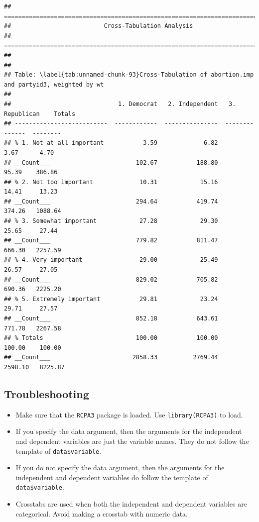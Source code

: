 \documentclass[
]{book}
\providecommand{\tightlist}{%
  \setlength{\itemsep}{0pt}\setlength{\parskip}{0pt}}
\begin{document}
\begin{verbatim}
## ===========================================================================
##                          Cross-Tabulation Analysis
## ===========================================================================
## 
## 
## Table: \label{tab:unnamed-chunk-93}Cross-Tabulation of abortion.imp and partyid3, weighted by wt
## 
##                              1. Democrat   2. Independent   3. Republican    Totals
## --------------------------  ------------  ---------------  --------------  --------
## % 1. Not at all important           3.59             6.82            3.67      4.70
## __Count___                        102.67           188.80           95.39    386.86
## % 2. Not too important             10.31            15.16           14.41     13.23
## __Count___                        294.64           419.74          374.26   1088.64
## % 3. Somewhat important            27.28            29.30           25.65     27.44
## __Count___                        779.82           811.47          666.30   2257.59
## % 4. Very important                29.00            25.49           26.57     27.05
## __Count___                        829.02           705.82          690.36   2225.20
## % 5. Extremely important           29.81            23.24           29.71     27.57
## __Count___                        852.18           643.61          771.78   2267.58
## % Totals                          100.00           100.00          100.00    100.00
## __Count___                       2858.33          2769.44         2598.10   8225.87
\end{verbatim}

\hypertarget{troubleshooting-36}{%
\subsection{Troubleshooting}\label{troubleshooting-36}}

\begin{itemize}
\tightlist
\item
  Make sure that the \texttt{RCPA3} package is loaded. Use \texttt{library(RCPA3)} to load.
\item
  If you specify the data argument, then the arguments for the independent and dependent variables are just the variable names. They do not follow the template of \texttt{data\$variable}.
\item
  If you do not specify the data argument, then the arguments for the independent and dependent variables do follow the template of \texttt{data\$variable}.
\item
  Crosstabs are used when both the independent and dependent variables are categorical. Avoid making a crosstab with numeric data.
\end{itemize}
\end{document}
